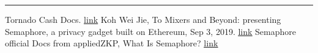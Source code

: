 \documentclass[letterpaper, 10 pt, conference]{ieeeconf}  %
\begin{document}
\noindent\rule{8cm}{0.4pt}
\begin{thebibliography}{99}
 Tornado Cash Docs. \href{https://docs.tornado.cash/general/how-to-become-a-relayer}{\underline{link}}
 Koh Wei Jie, To Mixers and Beyond: presenting Semaphore, a privacy gadget built on Ethereum, Sep 3, 2019.
 \href{https://medium.com/coinmonks/to-mixers-and-beyond-presenting-semaphore-a-privacy-gadget-built-on-ethereum-4c8b00857c9b}{\underline{link}}
 Semaphore official Docs from appliedZKP, What Is Semaphore? \href{http://semaphore.appliedzkp.org/docs/introduction}{\underline{link}}
\end{thebibliography}
\end{document}

